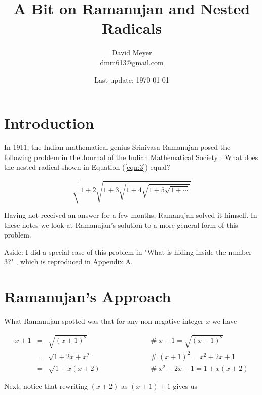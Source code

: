 \documentclass{article}
\title{A Bit on Ramanujan and Nested Radicals}
\author{David Meyer \\ \href{mailto:dmm613@gmail.com}
                            {dmm613@gmail.com}}
\date{Last update: \today}
\theoremstyle{definition}
\begin{document}
\maketitle
%
%
%
\section{Introduction}
In 1911, the Indian mathematical genius Srinivasa Ramanujan 
posed the following problem in the Journal of the Indian 
Mathematical Society \cite{ramanujan_roots}: What does the 
nested radical shown in Equation (\ref{eqn:3}) equal?


\bigskip
\begin{equation}
\sqrt{1+2 \sqrt{1+3 \sqrt{1+4  \sqrt{1+5 \sqrt{1 + \cdots}}}}}
\label{eqn:3}
\end{equation}

\medskip
\bigskip
\noindent
Having not received an answer for a few months, Ramanujan 
solved it himself. In these notes we look at Ramanujan’s 
solution to a more general form of this problem.

\bigskip
\noindent
Aside: I did a special case of this problem
in "What is hiding inside the number 3?"
\cite{notes:what_is_hiding_inside_the_number_3},
which is reproduced in Appendix A.

\section{Ramanujan's Approach}
What Ramanujan spotted was that for any non-negative 
integer $x$ we have

\medskip
\begin{equation*}
\begin{array}{llll}
x + 1
&=& \sqrt{(x+1)^2}		&\hspace{6em} \mathrel{\#} x+1 = \sqrt{(x+1)^2} \\
[5pt]
&=& \sqrt{1+2x+x^2}		&\hspace{6em} \mathrel{\#} (x+1)^2 = x^2+2x+1 \\
[5pt]
&=& \sqrt{1+x(x + 2)}	&\hspace{6em} \mathrel{\#} x^2+2x+1 = 1+x(x+2)
\end{array}
\end{equation*}

\bigskip
\noindent
Next, notice that rewriting $(x+2)$ as $(x+1)+1$
gives us
\end{document}
